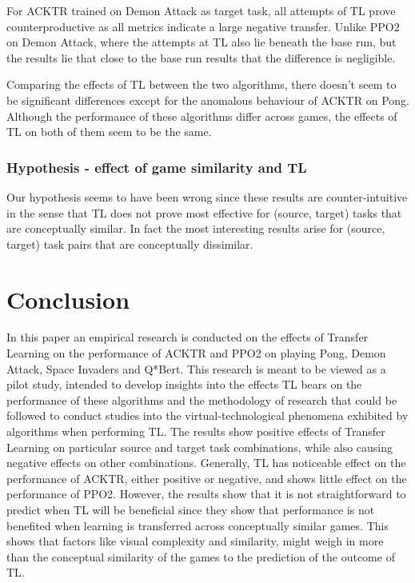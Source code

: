 For ACKTR trained on Demon Attack as target task, all attempts of TL prove counterproductive as all metrics indicate a large negative transfer. Unlike PPO2 on Demon Attack, where the attempts at TL also lie beneath the base run, but the results lie that close to the base run results that the difference is negligible.

Comparing the effects of TL between the two algorithms, there doesn’t seem to be significant differences except for the anomalous behaviour of ACKTR on Pong. Although the performance of these algorithms differ across games, the effects of TL on both of them seem to be the same. 

\subsubsection*{Hypothesis - effect of game similarity and TL}
Our hypothesis seems to have been wrong since these results are counter-intuitive in the sense that TL does not prove most effective for (source, target) tasks that are conceptually similar. In fact the most interesting results arise for (source, target) task pairs that are conceptually dissimilar.

\section{Conclusion}
In this paper an empirical research is conducted on the effects of Transfer Learning on the performance of ACKTR and PPO2 on playing Pong, Demon Attack, Space Invaders and Q*Bert. This research is meant to be viewed as a pilot study, intended to develop insights into the effects TL bears on the performance of these algorithms and the methodology of research that could be followed to conduct studies into the virtual-technological phenomena exhibited by algorithms when performing TL. The results show positive effects of Transfer Learning on particular source and target task combinations, while also causing negative effects on other combinations. Generally, TL has noticeable effect on the performance of ACKTR, either positive or negative, and shows little effect on the performance of PPO2. However, the results show that it is not straightforward to predict when TL will be beneficial since they show that performance is not benefited when learning is transferred across conceptually similar games. This shows that factors like visual complexity and similarity, might weigh in more than the conceptual similarity of the games to the prediction of the outcome of TL.

